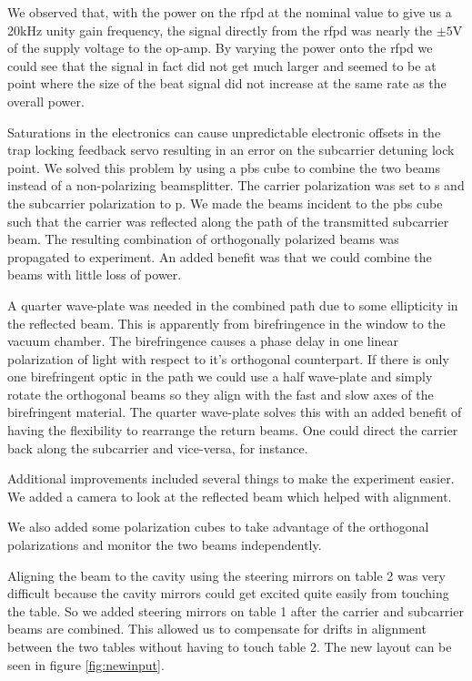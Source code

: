 We observed that, with the power on the \ac{rfpd} at the nominal value to give
us a 20kHz unity gain frequency, the signal directly from the \ac{rfpd} was
nearly the $\pm 5\mathrm{V}$ of the supply voltage to the op-amp.
By varying the power onto the \ac{rfpd} we could see that the signal in
fact did not get much larger and seemed to be at point where the size of the
beat signal did not increase at the same rate as the overall power.

Saturations in the electronics can cause unpredictable electronic
offsets in the trap locking feedback servo
resulting in an error on the subcarrier detuning lock point.
We solved this problem by using a \ac{pbs} cube to combine the two beams
instead of a non-polarizing beamsplitter.
The carrier polarization was set to s and the subcarrier polarization to p.
We made the beams incident to the \ac{pbs} cube such that the carrier was
reflected along the path of the transmitted subcarrier beam.
The resulting combination of orthogonally polarized beams was propagated
to experiment.
An added benefit was that we could combine the beams with little loss of
power.

A quarter wave-plate was needed in the combined path due to some ellipticity
in the reflected beam.
This is apparently from birefringence in the window to the vacuum chamber.
The birefringence causes a phase delay in one linear polarization of light
with respect to it's orthogonal counterpart.
If there is only one birefringent optic in the path we could use a
half wave-plate and simply rotate the orthogonal beams so they align with
the fast and slow axes of the birefringent material.
The quarter wave-plate solves this with an added benefit of having the
flexibility to rearrange the return beams. One could direct the carrier
back along the subcarrier and vice-versa, for instance.

Additional improvements included several things to make the experiment easier.
We added a camera to look at the reflected beam which helped with alignment.

We also added some polarization cubes to take advantage of the orthogonal
polarizations and monitor the two beams independently.

Aligning the beam to the cavity using the steering mirrors on table 2 was very
difficult because the cavity mirrors could get excited quite easily from
touching the table.
So we added steering mirrors on table 1 after the carrier and subcarrier
beams are combined. This allowed us to compensate for drifts in alignment
between the two tables without having to touch table 2.
The new layout can be seen in figure \ref{fig:newinput}.

